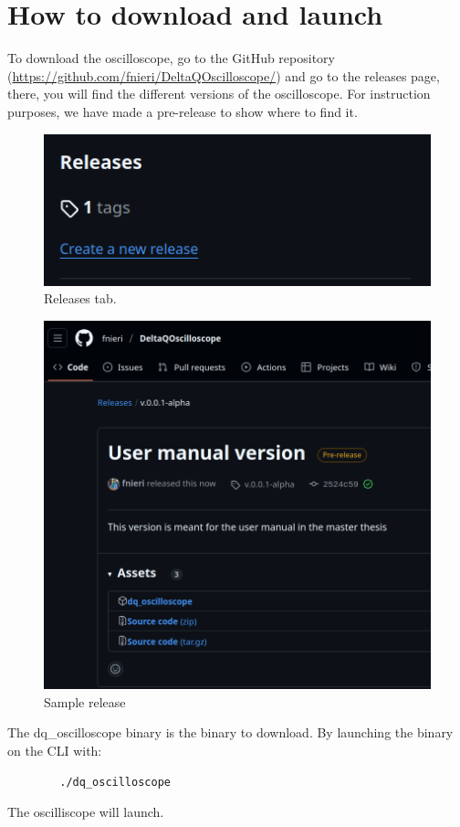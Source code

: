 \chapter{How to download and launch}
    To download the oscilloscope, go to the GitHub repository (\url{https://github.com/fnieri/DeltaQOscilloscope/}) and go to the releases page, there, you will find the different versions of the oscilloscope. For instruction purposes, we have made a pre-release to show where to find it.

   \begin{figure}[H]
        \begin{center}
            \includegraphics[width = \textwidth]{img/manual/releases.png}
        \end{center}
        \caption{Releases tab.}
    \end{figure}


   \begin{figure}[H]
        \begin{center}
            \includegraphics[width = \textwidth]{img/manual/release.png}
        \end{center}
        \caption{Sample release}
    \end{figure}

    The dq\_oscilloscope binary is the binary to download. By launching the binary on the CLI with:
    \begin{verbatim}
        ./dq_oscilloscope
    \end{verbatim}
    The oscilliscope will launch.
